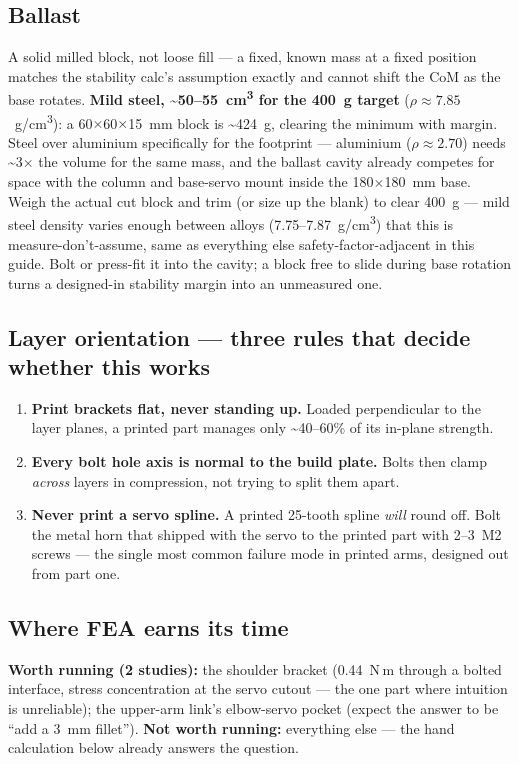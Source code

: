 \documentclass[11pt]{article}
\begin{document}
\subsection{Ballast}
A solid milled block, not loose fill --- a fixed, known mass at a fixed position matches the stability calc's assumption exactly and cannot shift the CoM as the base rotates. \textbf{Mild steel, \textasciitilde50--55~cm\textsuperscript{3} for the 400~g target} ($\rho\approx7.85$~g/cm\textsuperscript{3}): a 60$\times$60$\times$15~mm block is \textasciitilde424~g, clearing the minimum with margin. Steel over aluminium specifically for the footprint --- aluminium ($\rho\approx2.70$) needs \textasciitilde3$\times$ the volume for the same mass, and the ballast cavity already competes for space with the column and base-servo mount inside the 180$\times$180~mm base. Weigh the actual cut block and trim (or size up the blank) to clear 400~g --- mild steel density varies enough between alloys (7.75--7.87~g/cm\textsuperscript{3}) that this is measure-don't-assume, same as everything else safety-factor-adjacent in this guide. Bolt or press-fit it into the cavity; a block free to slide during base rotation turns a designed-in stability margin into an unmeasured one.

\subsection{Layer orientation --- three rules that decide whether this works}
\begin{enumerate}
\item \textbf{Print brackets flat, never standing up.} Loaded perpendicular to the layer planes, a printed part manages only \textasciitilde40--60\% of its in-plane strength.
\item \textbf{Every bolt hole axis is normal to the build plate.} Bolts then clamp \emph{across} layers in compression, not trying to split them apart.
\item \textbf{Never print a servo spline.} A printed 25-tooth spline \emph{will} round off. Bolt the metal horn that shipped with the servo to the printed part with 2--3~M2 screws --- the single most common failure mode in printed arms, designed out from part one.
\end{enumerate}

\subsection{Where FEA earns its time}
\textbf{Worth running (2 studies):} the shoulder bracket (0.44~N\,m through a bolted interface, stress concentration at the servo cutout --- the one part where intuition is unreliable); the upper-arm link's elbow-servo pocket (expect the answer to be ``add a 3~mm fillet''). \textbf{Not worth running:} everything else --- the hand calculation below already answers the question.
\end{document}
